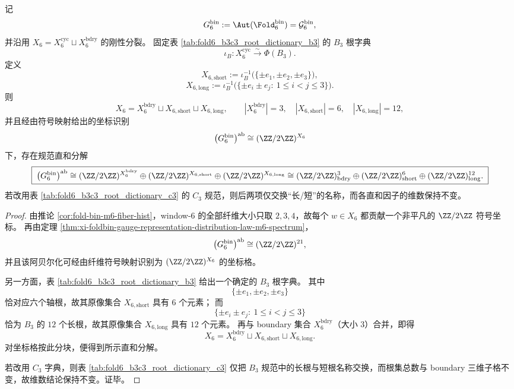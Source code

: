 \begin{theorem}\label{thm:xi-window6-parity-charge-trigrading-b3}
记
\[
G_6^{\mathrm{bin}}:=\Aut(\Fold_6^{\mathrm{bin}})=\mathcal G_6^{\mathrm{bin}},
\]
并沿用 \(X_6=X_6^{\mathrm{cyc}}\sqcup X_6^{\mathrm{bdry}}\) 的刚性分裂。
固定表 \ref{tab:fold6_b3c3_root_dictionary_b3} 的 \(B_3\) 根字典
\[
\iota_B:X_6^{\mathrm{cyc}}\xrightarrow{\sim}\Phi(B_3).
\]
定义
\[
X_{6,\mathrm{short}}
:=
\iota_B^{-1}\bigl(\{\pm e_1,\pm e_2,\pm e_3\}\bigr),
\]
\[
X_{6,\mathrm{long}}
:=
\iota_B^{-1}\bigl(\{\pm e_i\pm e_j:\ 1\le i<j\le 3\}\bigr).
\]
则
\[
X_6=X_6^{\mathrm{bdry}}\sqcup X_{6,\mathrm{short}}\sqcup X_{6,\mathrm{long}},
\qquad
|X_6^{\mathrm{bdry}}|=3,\quad |X_{6,\mathrm{short}}|=6,\quad |X_{6,\mathrm{long}}|=12,
\]
并且经由符号映射给出的坐标识别
\[
\bigl(G_6^{\mathrm{bin}}\bigr)^{\mathrm{ab}}\cong (\ZZ/2\ZZ)^{X_6}
\]
下，存在规范直和分解
\[
\boxed{\;
\bigl(G_6^{\mathrm{bin}}\bigr)^{\mathrm{ab}}
\cong
(\ZZ/2\ZZ)^{X_6^{\mathrm{bdry}}}
\oplus
(\ZZ/2\ZZ)^{X_{6,\mathrm{short}}}
\oplus
(\ZZ/2\ZZ)^{X_{6,\mathrm{long}}}
\cong
(\ZZ/2\ZZ)^3_{\mathrm{bdry}}
\oplus
(\ZZ/2\ZZ)^6_{\mathrm{short}}
\oplus
(\ZZ/2\ZZ)^{12}_{\mathrm{long}}.\;}
\]
若改用表 \ref{tab:fold6_b3c3_root_dictionary_c3} 的 \(C_3\) 规范，则后两项仅交换“长/短”的名称，而各直和因子的维数保持不变。
\end{theorem}
\begin{proof}
由推论 \ref{cor:fold-bin-m6-fiber-hist}，window-\(6\) 的全部纤维大小只取 \(2,3,4\)，故每个
\(w\in X_6\) 都贡献一个非平凡的 \(\ZZ/2\ZZ\) 符号坐标。
再由定理 \ref{thm:xi-foldbin-gauge-representation-distribution-law-m6-spectrum}，
\[
\bigl(G_6^{\mathrm{bin}}\bigr)^{\mathrm{ab}}\cong (\ZZ/2\ZZ)^{21},
\]
并且该阿贝尔化可经由纤维符号映射识别为 \((\ZZ/2\ZZ)^{X_6}\) 的坐标格。
\par
另一方面，表 \ref{tab:fold6_b3c3_root_dictionary_b3} 给出一个确定的 \(B_3\) 根字典。
其中
\[
\{\pm e_1,\pm e_2,\pm e_3\}
\]
恰对应六个轴根，故其原像集合 \(X_{6,\mathrm{short}}\) 具有 \(6\) 个元素；
而
\[
\{\pm e_i\pm e_j:\ 1\le i<j\le 3\}
\]
恰为 \(B_3\) 的 \(12\) 个长根，故其原像集合 \(X_{6,\mathrm{long}}\) 具有 \(12\) 个元素。
再与 boundary 集合 \(X_6^{\mathrm{bdry}}\)（大小 \(3\)）合并，即得
\[
X_6=X_6^{\mathrm{bdry}}\sqcup X_{6,\mathrm{short}}\sqcup X_{6,\mathrm{long}}.
\]
对坐标格按此分块，便得到所示直和分解。
\par
若改用 \(C_3\) 字典，则表 \ref{tab:fold6_b3c3_root_dictionary_c3} 仅把 \(B_3\) 规范中的长根与短根名称交换，而根集总数与 boundary 三维子格不变，故维数结论保持不变。证毕。
\end{proof}

